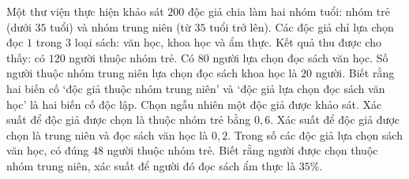 \cauds

\begin{ex}%
Một thư viện thực hiện khảo sát $200$ độc giả chia làm hai nhóm tuổi: nhóm trẻ (dưới $35$ tuổi) và nhóm trung niên (từ $35$ tuổi trở lên). Các độc giả chỉ lựa chọn đọc $1$ trong $3$ loại sách: văn học, khoa học và ẩm thực. Kết quả thu được cho thấy: có $120$ người thuộc nhóm trẻ. Có $80$ người lựa chọn đọc sách văn học. Số người thuộc nhóm trung niên lựa chọn đọc sách khoa học là $20$ người. Biết rằng hai biến cố `độc giả thuộc nhóm trung niên' và `độc giả lựa chọn đọc sách văn học' là hai biến cố độc lập. Chọn ngẫu nhiên một độc giả được khảo sát.
\choiceTF
{\True Xác suất để độc giả được chọn là thuộc nhóm trẻ bằng $0{,}6$.}
{Xác suất để độc giả được chọn là trung niên và đọc sách văn học là $0{,}2$.}
{\True Trong số các độc giả lựa chọn sách văn học, có đúng $48$ người thuộc nhóm trẻ.}
{\True Biết rằng người được chọn thuộc nhóm trung niên, xác suất để người đó đọc sách ẩm thực là $35\%$.}
\end{ex}

